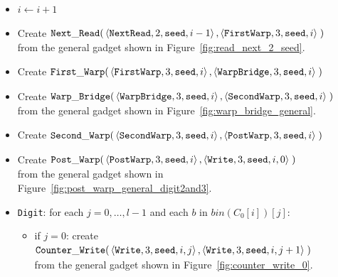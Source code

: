 \begin{itemize}
    \item $i \gets i + 1$

    \item Create
    $\begin{aligned}[t]
        {\tt Next\_Read}(&\left\langle {\tt NextRead},  2, {\tt seed}, i - 1 \right\rangle,
                   \left\langle {\tt FirstWarp}, 3, {\tt seed}, i     \right\rangle \;)
    \end{aligned}$\\ from the general gadget shown in Figure~\ref{fig:read_next_2_seed}.

    \item Create
    $\begin{aligned}[t]
        {\tt First\_Warp}(&\left\langle {\tt FirstWarp},  3, {\tt seed}, i \right\rangle,
                    \left\langle {\tt WarpBridge}, 3, {\tt seed}, i \right\rangle \;)
    \end{aligned}$

    \item Create
    $\begin{aligned}[t]
        {\tt Warp\_Bridge}(&\left\langle {\tt WarpBridge}, 3, {\tt seed}, i \right\rangle,
                     \left\langle {\tt SecondWarp}, 3, {\tt seed}, i \right\rangle \;)
    \end{aligned}$\\ from the general gadget shown in Figure~\ref{fig:warp_bridge_general}.

    \item Create
    $\begin{aligned}[t]
        {\tt Second\_Warp}(&\left\langle {\tt SecondWarp}, 3, {\tt seed}, i  \right\rangle,
                     \left\langle {\tt PostWarp},   3, {\tt seed}, i  \right\rangle \;)
    \end{aligned}$

    \item Create
    $\begin{aligned}[t]
        {\tt Post\_Warp}(&\left\langle {\tt PostWarp}, 3, {\tt seed}, i    \right\rangle,
                   \left\langle {\tt Write},    3, {\tt seed}, i, 0 \right\rangle \;)
    \end{aligned}$\\from the general gadget shown in Figure~\ref{fig:post_warp_general_digit2and3}.


    \item {\tt Digit}: for each $j=0,\ldots,l-1$ and each $b$ in $bin(C_0[i])[j]$:
    \begin{itemize}
        \item if $j = 0$: create
        $\begin{aligned}[t]
            {\tt Counter\_Write}(&\left\langle {\tt Write}, 3, {\tt seed}, i, j \right\rangle, \left\langle {\tt Write}, 3, {\tt seed}, i, j + 1 \right\rangle \;)
        \end{aligned}$\\from the general gadget shown in Figure~\ref{fig:counter_write_0}.


\end{itemize}
\end{itemize}
